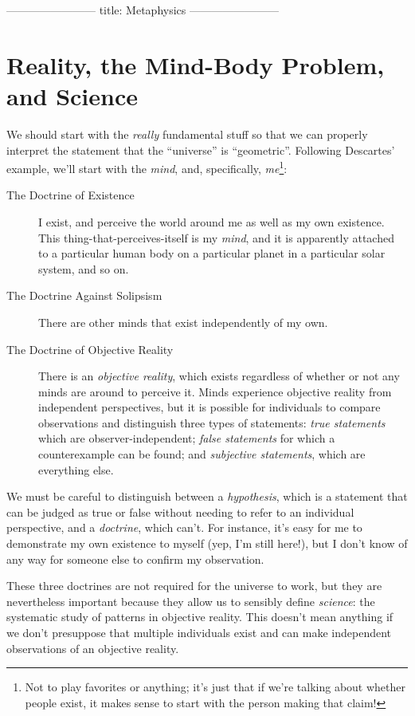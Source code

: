 ------------------------
title: Metaphysics
------------------------

\section{Reality, the Mind-Body Problem, and Science}

We should start with the \emph{really} fundamental stuff so that we can properly interpret the statement that the ``universe'' is ``geometric''. Following Descartes' example, we'll start with the \emph{mind}, and, specifically, \emph{me}\footnote{Not to play favorites or anything; it's just that if we're talking about whether people exist, it makes sense to start with the person making that claim!}:

\begin{description}
  \item[The Doctrine of Existence] I exist, and perceive the world around me as well as my own existence. This thing-that-perceives-itself is my \emph{mind}, and it is apparently attached to a particular human body on a particular planet in a particular solar system, and so on.
  \item[The Doctrine Against Solipsism] There are other minds that exist independently of my own.
  \item[The Doctrine of Objective Reality] There is an \emph{objective reality}, which exists regardless of whether or not any minds are around to perceive it. Minds experience objective reality from independent perspectives, but it is possible for individuals to compare observations and distinguish three types of statements: \emph{true statements} which are observer-independent; \emph{false statements} for which a counterexample can be found; and \emph{subjective statements}, which are everything else.
\end{description}

We must be careful to distinguish between a \emph{hypothesis}, which is a statement that can be judged as true or false without needing to refer to an individual perspective, and a \emph{doctrine}, which can't. For instance, it's easy for me to demonstrate my own existence to myself (yep, I'm still here!), but I don't know of any way for someone else to confirm my observation.

These three doctrines are not required for the universe to work, but they are nevertheless important because they allow us to sensibly define \emph{science}: the systematic study of patterns in objective reality. This doesn't mean anything if we don't presuppose that multiple individuals exist and can make independent observations of an objective reality.

